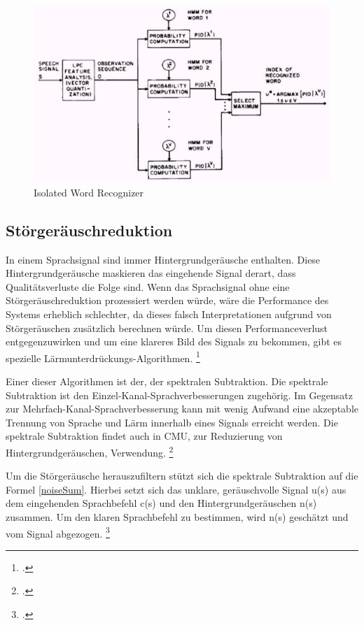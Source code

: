 \begin{figure}[h]
	\centering
  \includegraphics[scale=0.5]{images/iso_word_recog.png}
	\caption{Isolated Word Recognizer}
	\label{figIsoRecognition}
\end{figure}


\subsection{Störgeräuschreduktion}
In einem Sprachsignal sind immer Hintergrundgeräusche enthalten. Diese Hintergrundgeräusche maskieren das eingehende Signal derart, dass Qualitätsverluste die Folge sind. Wenn das Sprachsignal ohne eine Störgeräuschreduktion prozessiert werden würde, wäre die Performance des Systems erheblich schlechter, da dieses falsch Interpretationen aufgrund von Störgeräuschen zusätzlich berechnen würde.
Um diesen Performanceverlust entgegenzuwirken und um eine klareres Bild des Signals zu bekommen, gibt es spezielle Lärmunterdrückungs-Algorithmen. 
\footcite[vlg.:][S. 1 ]{specSub}

Einer dieser Algorithmen ist der, der spektralen Subtraktion. Die spektrale Subtraktion ist den Einzel-Kanal-Sprachverbesserungen zugehörig. Im Gegensatz zur Mehrfach-Kanal-Sprachverbesserung kann mit wenig Aufwand eine akzeptable Trennung von Sprache und Lärm innerhalb eines Signals erreicht werden. Die spektrale Subtraktion findet auch in \ac{CMU}, zur Reduzierung von Hintergrundgeräuschen, Verwendung. 
\footcite[vlg.:][S. 1 ]{specSub}

Um die Störgeräusche herauszufiltern stützt sich die spektrale Subtraktion auf die Formel \ref{noiseSum}. Hierbei setzt sich das unklare, geräuschvolle Signal u(s) aus dem eingehenden Sprachbefehl c(s) und den Hintergrundgeräuschen n(s) zusammen. Um den klaren Sprachbefehl zu bestimmen, wird n(s) geschätzt und vom Signal abgezogen. 
\footcite[vlg.:][S. 2 f.]{specSub}


